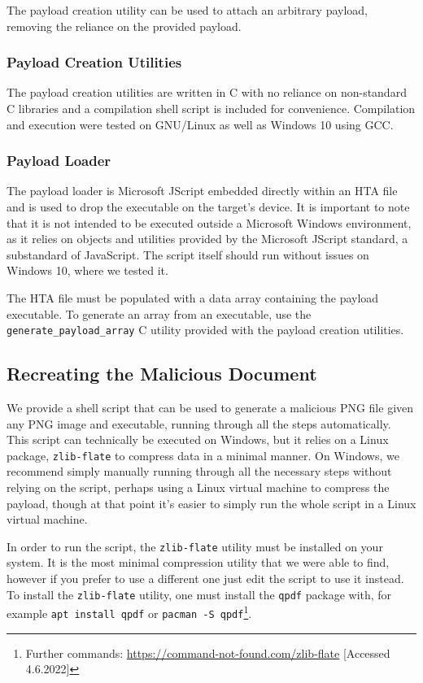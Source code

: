 The payload creation utility can be used to attach an arbitrary payload, removing the reliance on the provided 
payload.

\subsubsection{Payload Creation Utilities}
The payload creation utilities are written in C with no reliance on non-standard C libraries and a compilation
shell script is included for convenience. Compilation and execution were tested on GNU/Linux as well as Windows 10
using \acrshort{GCC}.

\subsubsection{Payload Loader}
The payload loader is Microsoft JScript embedded directly within an \acrfull{HTA} file and is used to drop the
executable on the target's device. It is important to note that it is not intended to be executed outside a 
Microsoft Windows environment, as it relies on objects and utilities provided by the Microsoft JScript standard,
a substandard of JavaScript. The script itself should run without issues on Windows 10, where we tested it.

The \acrshort{HTA} file must be populated with a data array containing the payload executable. To generate an array
from an executable, use the \verb+generate_payload_array+ C utility provided with the payload creation utilities.

\subsection{Recreating the Malicious Document}
We provide a shell script that can be used to generate a malicious \acrshort{PNG} file given any \acrshort{PNG} 
image and executable, running through all the steps automatically. This script can technically be executed on Windows,
but it relies on a Linux package, \verb+zlib-flate+ to compress data in a minimal manner. On Windows, we recommend
simply manually running through all the necessary steps without relying on the script, perhaps using a Linux virtual 
machine to  compress the payload, though at that point it's easier to simply run the whole script in a 
Linux virtual machine.

In order to run the script, the \verb+zlib-flate+ utility must be installed on your system. It is the most minimal
compression utility that we were able to find, however if you prefer to use a different one just edit the script to use
it instead. To install the \verb+zlib-flate+ utility, one must install the \verb+qpdf+ package with, for example
\verb+apt install qpdf+ or \verb+pacman -S qpdf+\footnote{Further commands:
\url{https://command-not-found.com/zlib-flate} [Accessed 4.6.2022]}. 

